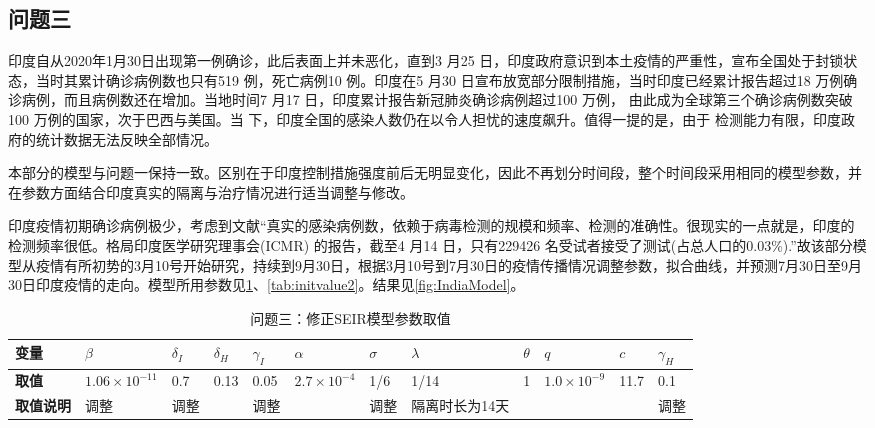 \documentclass[withoutpre]{cumcmthesis} %
\begin{document}
\subsection{问题三}
印度自从2020年1月30日出现第一例确诊，此后表面上并未恶化，直到3 月25 日，印度政府意识到本土疫情的严重性，宣布全国处于封锁状态，当时其累计确诊病例数也只有519 例，死亡病例10 例。印度在5 月30 日宣布放宽部分限制措施，当时印度已经累计报告超过18 万例确诊病例，而且病例数还在增加。当地时间7 月17 日，印度累计报告新冠肺炎确诊病例超过100 万例，
由此成为全球第三个确诊病例数突破100 万例的国家，次于巴西与美国。当
下，印度全国的感染人数仍在以令人担忧的速度飙升。值得一提的是，由于
检测能力有限，印度政府的统计数据无法反映全部情况。


本部分的模型与问题一保持一致。区别在于印度控制措施强度前后无明显变化，因此不再划分时间段，整个时间段采用相同的模型参数，并在参数方面结合印度真实的隔离与治疗情况进行适当调整与修改。

印度疫情初期确诊病例极少，考虑到文献\cite{reference4}“真实的感染病例数，依赖于病毒检测的规模和频率、检测的准确性。很现实的一点就是，印度的检测频率很低。格局印度医学研究理事会(ICMR) 的报告，截至4 月14 日，只有229426 名受试者接受了测试(占总人口的0.03\%).”故该部分模型从疫情有所初势的3月10号开始研究，持续到9月30日，根据3月10号到7月30日的疫情传播情况调整参数，拟合曲线，并预测7月30日至9月30日印度疫情的走向。模型所用参数见\cref{tab:intipara2}、\cref{tab:initvalue2}。结果见\cref{fig:IndiaModel}。

\begin{table}[H]\small
    \caption{问题三：修正SEIR模型参数取值}
    \label{tab:intipara2} \centering
    \begin{tabular}{p{1cm}p{0.7cm}p{0.7cm}p{0.7cm}p{0.7cm}p{0.7cm}p{0.7cm}p{1.5cm}p{0.7cm}p{0.7cm}p{0.7cm}p{0.7cm}}
        \toprule[1.5pt]
        \textbf{变量} & $\beta$ & $\delta_I$ & $\delta_H$ & $\gamma_I$ & $\alpha$ & $\sigma $ & $\lambda$ &$\theta$&$q$&$c$&$\gamma_H$\\
        \midrule[1pt]
        \textbf{取值} & $1.06 \times 10^{-11}$ & 0.7& 0.13& 0.05& $ 2.7 \times 10^{-4} $ & 1/6& 1/14&1&$1.0 \times 10^{-9}$&11.7&0.1\\
        \textbf{取值说明} &  调整&  调整&  \cite{reference1}&  调整&  \cite{reference2}&调整 & 隔离时长为14天& \cite{reference4}& \cite{reference4}& \cite{reference4}&调整\\
        \bottomrule[1.5pt]
    \end{tabular}
\end{table}
\end{document}
